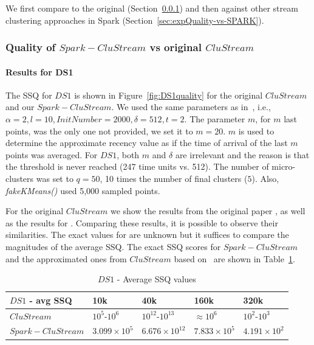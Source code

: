 We first compare \our to the original \clustream (Section~\ref{sec:expQuality-vs-CluStream}) and then against other stream clustering approaches in Spark (Section~\ref{sec:expQuality-vs-SPARK}).

\subsubsection{Quality of $Spark-CluStream$ vs original $CluStream$}
\label{sec:expQuality-vs-CluStream}
\paragraph{Results for DS1}
The SSQ for $DS1$ is shown in Figure~\ref{fig:DS1quality} for the original $CluStream$ and our $Spark-CluStream$.
We used the same parameters as in~\cite{clustreamOrig}, i.e., $\alpha=2,l=10,InitNumber=2000,\delta=512,t=2$.
The parameter $m$, for $m$ last points, was the only one not provided, we set it to $m=20$. $m$ is used to determine the approximate recency value as if the time of arrival of the last $m$ points was averaged.
For $DS1$, both $m$ and $\delta$ are irrelevant and the reason is that the threshold is never reached (247 time units vs. 512). 
The number of micro-clusters was set to $q=50$, 10 times the number of final clusters ($5$). 
Also, \textit{fakeKMeans()} used 5,000 sampled points. 

For the original $CluStream$ we show the results from the original paper \cite{clustreamOrig}, as well as the results for \our. Comparing these results, it is possible to observe their similarities. The exact values for \cite{clustreamOrig} are unknown but it suffices to compare the magnitudes of the average SSQ. 
The exact SSQ scores for $Spark-CluStream$ and the approximated ones from $CluStream$ based on~\cite{clustreamOrig} are shown in Table~\ref{tab:DS1quality}.

\begin{table}[t]
\centering
  \begin{tabular}{|l|l|l|l|l|}\hline
\textbf{$DS1$ - avg SSQ} & \textbf{10k} & \textbf{40k} & \textbf{160k} & \textbf{320k}\\\hline
$CluStream$ & $10^5$-$10^6$ & $10^{12}$-$10^{13}$ & $\approx 10^6$ & $10^2$-$10^3$\\\hline
$Spark-CluStream$ & $3.099\times10^5$ & $6.676\times10^{12}$ & $7.833\times10^5$ & $4.191\times10^2$\\\hline
  \end{tabular}
  \caption{$DS1$ - Average SSQ values}
  \label{tab:DS1quality}
\end{table}



